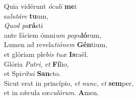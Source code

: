 \evenverse Quia vidérunt \textit{ó}\textit{cu}\textit{li} \textbf{me}i~\*\\
\evenverse sa\textit{lu}\textit{tá}\textit{re} \textbf{tu}um,\\
\oddverse \textit{Quod} \textit{pa}\textbf{rá}sti~\*\\
\oddverse ante fáciem ómni\textit{um} \textit{po}\textit{pu}\textbf{ló}rum,\\
\evenverse Lumen ad revela\textit{ti}\textit{ó}\textit{nem} \textbf{Gén}tium,~\*\\
\evenverse et glóriam ple\textit{bis} \textit{tu}\textit{æ} \textbf{Is}raël.\\
\oddverse Glória \textit{Pa}\textit{tri}, \textit{et} \textbf{Fí}lio,~\*\\
\oddverse et Spi\textit{rí}\textit{tu}\textit{i} \textbf{San}cto.\\
\evenverse Sicut erat in princípio, \textit{et} \textit{nunc}, \textit{et} \textbf{sem}per,~\*\\
\evenverse et in sǽcula sæ\textit{cu}\textit{ló}\textit{rum}. \textbf{A}men.\\
